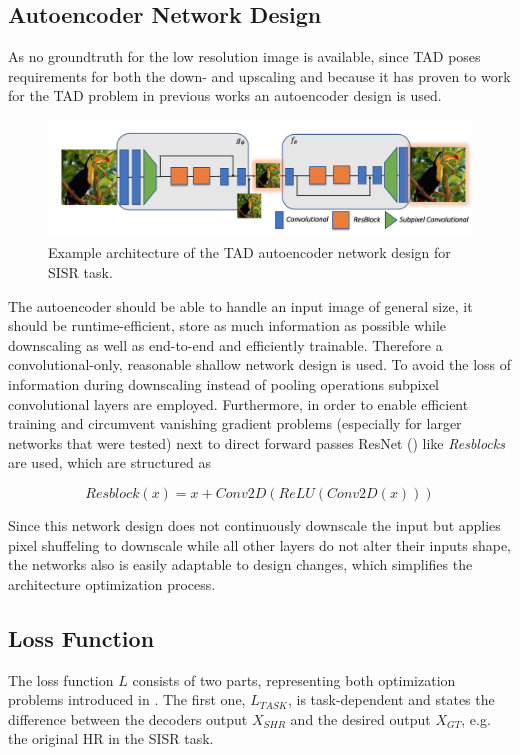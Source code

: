 \subsection{Autoencoder Network Design}
\label{sec:Approach_AND}
As no groundtruth for the low resolution image is available, since \ac{TAD}
poses requirements for both the down- and upscaling and because it has proven
to work for the \ac{TAD} problem in previous works an autoencoder design
is used.

\begin{figure}[!htbp]
	\centering
	\includegraphics[width=14cm]{figures/architecture}
	\caption{Example architecture of the \ac{TAD} autoencoder network
  design for \ac{SISR} task.}
  \label{fig:architecture}
\end{figure}

The autoencoder should be able to handle an input image of general size, it
should be runtime-efficient, store as much information as possible while
downscaling as well as end-to-end and efficiently trainable.
Therefore a convolutional-only, reasonable shallow network design is used. To
avoid the loss of information during downscaling instead of pooling operations
subpixel convolutional layers are employed. Furthermore, in order to enable
efficient training and circumvent vanishing gradient problems (especially for
larger networks that were tested) next to direct forward passes ResNet
(\cite{DRLFIR}) like \textit{Resblocks} are used, which are structured as

$$Resblock(x) = x + Conv2D(ReLU(Conv2D(x)))$$

Since this network design does not continuously downscale the input but
applies pixel shuffeling to downscale while all other layers do not alter their
inputs shape, the networks also is easily adaptable to design changes, which
simplifies the architecture optimization process.

\subsection{Loss Function}
\label{sec:Approach_LF}
The loss function $L$ consists of two parts, representing both optimization
problems introduced in . The first one, $L_{TASK}$, is
task-dependent and states the difference between the decoders output $X_{SHR}$
and the desired output $X_{GT}$, e.g. the original \ac{HR} in the \ac{SISR} task.

